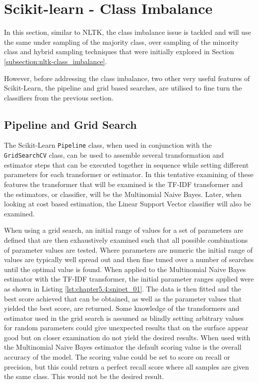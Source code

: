 \section{Scikit-learn - Class Imbalance}
\label{subsection:scikit-class-imbalance}

In this section, similar to NLTK, the class imbalance issue is tackled and will use the same under sampling of the majority class, over sampling of the minority class and hybrid sampling techniques that were initially explored in Section \ref{subsection:nltk-class_imbalance}.

However, before addressing the class imbalance, two other very useful features of Scikit-Learn, the pipeline and grid based searches, are utilised to fine turn the classifiers from the previous section.

\subsection{Pipeline and Grid Search}

The Scikit-Learn \verb|Pipeline| class, when used in conjunction with the \verb|GridSearchCV| class, can be used to assemble several transformation and estimator steps that can be executed together in sequence while setting different parameters for each transformer or estimator. In this tentative examining of these features the transformer that will be examined is the TF-IDF transformer and the estimators, or classifier, will be the Multinomial Naive Bayes. Later, when looking at cost based estimation, the Linear Support Vector classifier will also be examined. 

When using a grid search, an initial range of values for a set of parameters are defined that are then exhaustively examined such that all possible combinations of parameter values are tested. Where parameters are numeric the initial range of values are typically well spread out and then fine tuned over a number of searches until the optimal value is found. When applied to the Multinomial Naive Bayes estimator with the TF-IDF transformer, the initial parameter ranges applied were as shown in Listing \ref{lst:chapter5.4:snipet_01}. The data is then fitted and the best score achieved that can be obtained, as well as the parameter values that yielded the best score, are returned. Some knowledge of the transformers and estimator used in the grid search is assumed as blindly setting arbitrary values for random parameters could give unexpected results that on the surface appear good but on closer examination do not yield the desired results. When used with the Multinomial Naive Bayes estimator the default scoring value is the overall accuracy of the model. The scoring value could be set to score on recall or precision, but this could return a perfect recall score where all samples are given the same class. This would not be the desired result.

